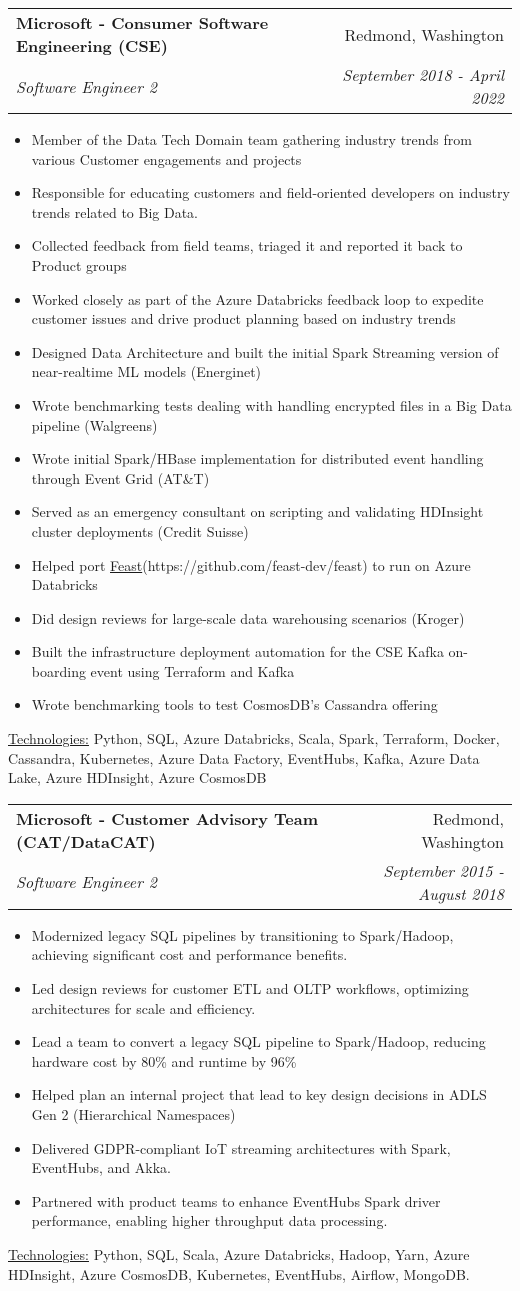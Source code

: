 \documentclass[letterpaper,11pt]{article}
\makeatletter
\newcommand{\sepsection}{\vspace{25pt}}
\newcommand{\resumeItem}[1]{%
  \item\small{
    #1
  }
}
\newcommand{\resumeSubheading}[4]{
  \vspace{8pt}\item%
    \begin{tabular*}{0.97\textwidth}[t]{l@{\extracolsep{\fill}}r}
      \textbf{#1} & #2 \\
      \textit{\small#3} & \textit{\small #4} \\
    \end{tabular*}\vspace{-5pt}
}
\newcommand{\resumeItemListStart}{\begin{itemize}}
\newcommand{\resumeItemListEnd}{\end{itemize}\vspace{-5pt}}
\newcommand{\resumeTech}[2]{
 \underline{#1:} #2
}
\makeatother
\begin{document}
    \resumeSubheading
      {Microsoft - Consumer Software Engineering (CSE)}{Redmond, Washington}
      {Software Engineer 2}{September 2018 - April 2022}
      \resumeItemListStart
      \resumeItem{Member of the Data Tech Domain team gathering industry trends from various Customer engagements and projects}
      \resumeItem{Responsible for educating customers and field-oriented developers on industry trends related to Big Data.}
      \resumeItem{Collected feedback from field teams, triaged it and reported it back to Product groups}
      \resumeItem{Worked closely as part of the Azure Databricks feedback loop to expedite customer issues and drive product planning based on industry trends}
      \resumeItem{Designed Data Architecture and built the initial Spark Streaming version of near-realtime ML models (Energinet)}
      \resumeItem{Wrote benchmarking tests dealing with handling encrypted files in a Big Data pipeline (Walgreens)}
      \resumeItem{Wrote initial Spark/HBase implementation for distributed event handling through Event Grid (AT\&T)}
      \resumeItem{Served as an emergency consultant on scripting and validating HDInsight cluster deployments (Credit Suisse)}
      \resumeItem{Helped port \href{https://github.com/feast-dev/feast}{Feast}(https://github.com/feast-dev/feast) to run on Azure Databricks}
      \resumeItem{Did design reviews for large-scale data warehousing scenarios (Kroger)}
      \resumeItem{Built the infrastructure deployment automation for the CSE Kafka on-boarding event using Terraform and Kafka}
      \resumeItem{Wrote benchmarking tools to test CosmosDB's Cassandra offering}
      \resumeItemListEnd
      \resumeTech{Technologies}{Python, SQL, Azure Databricks, Scala, Spark, Terraform, Docker, Cassandra, Kubernetes, Azure Data Factory, EventHubs, Kafka, Azure Data Lake, Azure HDInsight, Azure CosmosDB}\\
      
    \sepsection

    \newpage

    \resumeSubheading
      {Microsoft - Customer Advisory Team (CAT/DataCAT)}{Redmond, Washington}
      {Software Engineer 2}{September 2015 - August 2018}
      \resumeItemListStart
      \resumeItem{Modernized legacy SQL pipelines by transitioning to Spark/Hadoop, achieving significant cost and performance benefits.}
      \resumeItem{Led design reviews for customer ETL and OLTP workflows, optimizing architectures for scale and efficiency.}
      \resumeItem{Lead a team to convert a legacy SQL pipeline to Spark/Hadoop, reducing hardware cost by 80\% and runtime by 96\% }
      \resumeItem{Helped plan an internal project that lead to key design decisions in ADLS Gen 2 (Hierarchical Namespaces)}
      \resumeItem{Delivered GDPR-compliant IoT streaming architectures with Spark, EventHubs, and Akka.}
      \resumeItem{Partnered with product teams to enhance EventHubs Spark driver performance, enabling higher throughput data processing.}
      \resumeItemListEnd
      \resumeTech{Technologies}{Python, SQL, Scala, Azure Databricks, Hadoop, Yarn, Azure HDInsight, Azure CosmosDB, Kubernetes, EventHubs, Airflow, MongoDB.}\\
\end{document}

